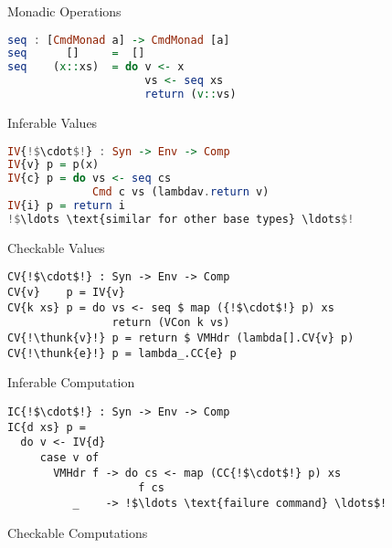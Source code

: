 \begin{figure}[float]

Monadic Operations
\begin{lstlisting}[language=Haskell]
seq : [CmdMonad a] -> CmdMonad [a]
seq      []     =  []
seq    (x::xs)  = do v <- x
                     vs <- seq xs
                     return (v::vs) 
\end{lstlisting}
Inferable Values
\begin{lstlisting}[language=Haskell]
IV{!$\cdot$!} : Syn -> Env -> Comp
IV{v} p = p(x)
IV{c} p = do vs <- seq cs
             Cmd c vs (lambdav.return v)
IV{i} p = return i
!$\ldots \text{similar for other base types} \ldots$!
\end{lstlisting}
Checkable Values
\begin{lstlisting}
CV{!$\cdot$!} : Syn -> Env -> Comp
CV{v}    p = IV{v}
CV{k xs} p = do vs <- seq $ map ({!$\cdot$!} p) xs
                return (VCon k vs)
CV{!\thunk{v}!} p = return $ VMHdr (lambda[].CV{v} p)
CV{!\thunk{e}!} p = lambda_.CC{e} p
\end{lstlisting}
Inferable Computation
\begin{lstlisting}
IC{!$\cdot$!} : Syn -> Env -> Comp
IC{d xs} p =
  do v <- IV{d}
     case v of
       VMHdr f -> do cs <- map (CC{!$\cdot$!} p) xs
                    f cs
          _    -> !$\ldots \text{failure command} \ldots$!
\end{lstlisting}
Checkable Computations
\begin{lstlisting}

\end{lstlisting}
\end{figure}
